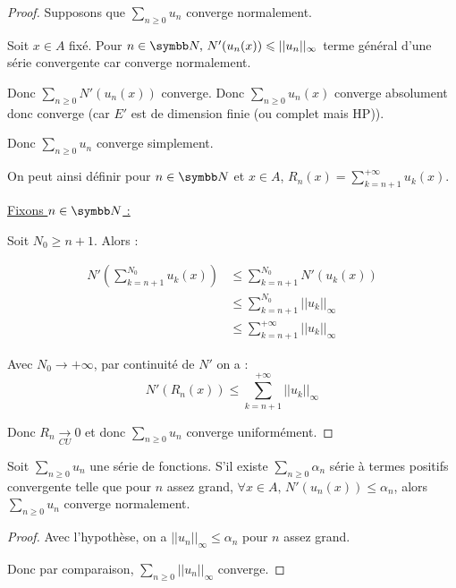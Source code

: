 \begin{proof}
    Supposons que $\displaystyle \sum_{n \geqslant 0} u_n$ converge normalement.

    Soit $x \in A$ fixé. Pour $n \in \N, \, N'(u_n(x)) \leqslant || u_n ||_{\infty}$ terme général 
    d'une série convergente car converge normalement. 

    Donc $\sum_{n \geqslant 0} N'(u_n(x))$ converge. Donc $\sum_{n \geqslant 0} u_n(x)$
    converge absolument donc converge (car $E'$ est de dimension finie (ou complet mais HP)). 

    Donc $\displaystyle \sum_{n \geqslant 0} u_n$ converge simplement.

    On peut ainsi définir pour $n \in \N$ et $x \in A$, $\displaystyle R_n(x) = \sum_{k = n + 1}^{ + \infty } u_k(x)$.

    \uline{Fixons $n \in \N$ :}

    Soit $N_0 \geqslant n + 1$. Alors :

    \begin{align*}
        N'\left( \sum_{k = n + 1}^{N_0} u_k(x) \right) & \leqslant \sum_{k = n + 1}^{N_0} N'(u_k(x)) \\
        & \leqslant \sum_{k = n + 1}^{N_0} || u_k ||_{\infty} \\
        & \leqslant \sum_{k = n + 1}^{ + \infty } || u_k ||_{\infty}
    \end{align*}

    Avec $N_0 \to + \infty$, par continuité de $N'$ on a : 
    \[N'(R_n(x)) \leqslant \sum_{k = n + 1}^{ + \infty } || u_k ||_{\infty}\]

    Donc $\displaystyle R_n \xrightarrow[CU]{} 0$ et donc $\displaystyle \sum_{n \geqslant 0} u_n$ converge uniformément.
\end{proof}

\begin{proposition}{}{}
    Soit $\sum_{n \geqslant 0} u_n$ une série de fonctions. S'il existe
    $\sum_{n \geqslant 0} \alpha_n$ série à termes positifs convergente telle que 
    pour $n$ assez grand, $\forall x \in A, \, N'(u_n(x)) \leqslant \alpha_n$, alors 
    $\sum_{n \geqslant 0} u_n$ converge normalement.
\end{proposition}


\begin{proof}
    Avec l'hypothèse, on a $||u_n||_\infty \leqslant \alpha_n$ pour $n$ assez grand. 

    Donc par comparaison, $\displaystyle \sum_{n \geqslant 0} || u_n ||_{\infty}$ converge.
\end{proof}

